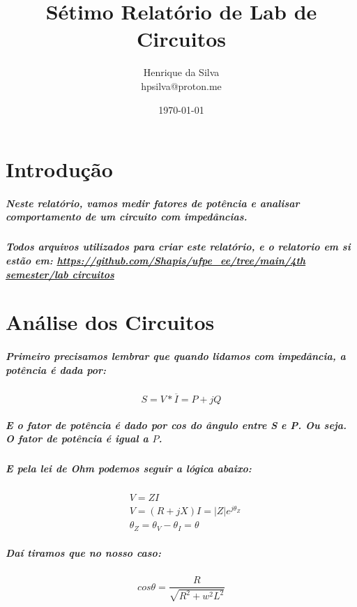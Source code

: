 \documentclass[12pt,twoside, a4paper, twocolumn]{article}
\title{Sétimo Relatório de Lab de Circuitos}
\author{Henrique da Silva \\ hpsilva@proton.me}
\date{\today}
\begin{document}
\maketitle
{}
\newpage
\tableofcontents
\newpage



\section{Introdução}


\subparagraph*{Neste relatório, vamos medir fatores de potência e analisar comportamento de um circuito com impedâncias.}

\subparagraph*{Todos arquivos utilizados para criar este relatório, e o relatorio em si estão em:  \url{https://github.com/Shapis/ufpe_ee/tree/main/4th semester/lab circuitos}}



\section{Análise dos Circuitos}


\subparagraph*{Primeiro precisamos lembrar que quando lidamos com impedância, a potência é dada por:
}

\begin{equation}
    S = V * \overline{I} = P + jQ
\end{equation}

\subparagraph*{E o fator de potência é dado por cos do ângulo entre S e P. Ou seja. O fator de potência é igual a $P$.}

\subparagraph*{E pela lei de Ohm podemos seguir a lógica abaixo:}

\begin{equation}
    \begin{aligned}
         & V = Z I                                 \\
         & V = (R + jX) I = |Z|e^{j \theta_Z}      \\
         & \theta_Z = \theta_V - \theta_I = \theta
    \end{aligned}
\end{equation}

\subparagraph*{Daí tiramos que no nosso caso:}

\begin{equation}
    cos \theta =  \frac{R}{\sqrt{R^2 + w^2 L^2}}
\end{equation}
\end{document}
